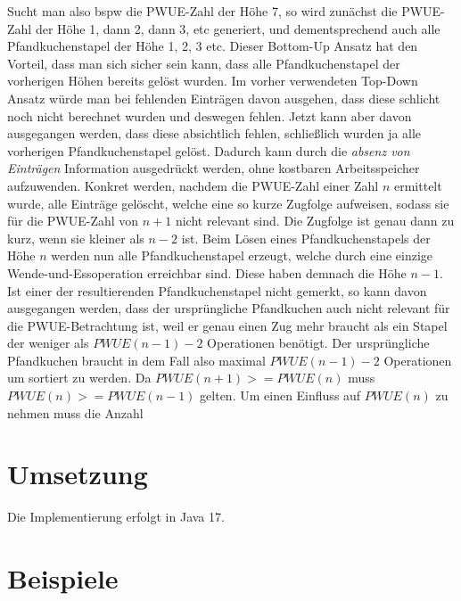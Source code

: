 Sucht man also bspw die PWUE-Zahl der Höhe 7, so wird zunächst die PWUE-Zahl der Höhe 1, dann 2, dann 3, etc generiert,
und dementsprechend auch alle Pfandkuchenstapel der Höhe 1, 2, 3 etc.
Dieser Bottom-Up Ansatz hat den Vorteil, dass man sich sicher sein kann, dass alle Pfandkuchenstapel der vorherigen
Höhen bereits gelöst wurden.
Im vorher verwendeten Top-Down Ansatz würde man bei fehlenden Einträgen davon ausgehen, dass diese schlicht noch nicht
berechnet wurden und deswegen fehlen.
Jetzt kann aber davon ausgegangen werden, dass diese absichtlich fehlen,
schlie{\ss}lich wurden ja alle vorherigen Pfandkuchenstapel gelöst.
Dadurch kann durch die \textit{absenz von Einträgen} Information ausgedrückt werden, ohne kostbaren
Arbeitsspeicher aufzuwenden.
Konkret werden, nachdem die PWUE-Zahl einer Zahl $n$ ermittelt wurde, alle Einträge gelöscht, welche eine so kurze Zugfolge
aufweisen, sodass sie für die PWUE-Zahl von $n + 1$ nicht relevant sind.
Die Zugfolge ist genau dann zu kurz, wenn sie kleiner als $n - 2$ ist.
Beim Lösen eines Pfandkuchenstapels der Höhe $n$ werden nun alle Pfandkuchenstapel erzeugt,
welche durch eine einzige Wende-und-Essoperation erreichbar sind.
Diese haben demnach die Höhe $n - 1$.
Ist einer der resultierenden Pfandkuchenstapel nicht gemerkt, so kann davon ausgegangen werden, dass der ursprüngliche
Pfandkuchen auch nicht relevant für die PWUE-Betrachtung ist, weil er genau einen Zug
mehr braucht als ein Stapel der weniger als $PWUE(n - 1) - 2$ Operationen benötigt.
Der ursprüngliche Pfandkuchen braucht in dem Fall also maximal $PWUE(n - 1) - 2$ Operationen um sortiert zu werden.
Da $PWUE(n + 1) >= PWUE(n)$ muss $PWUE(n) >= PWUE(n - 1)$ gelten.
Um einen Einfluss auf $PWUE(n)$ zu nehmen muss die Anzahl


\section{Umsetzung}\label{sec:umsetzung}
Die Implementierung erfolgt in Java 17.


\section{Beispiele}\label{sec:beispiele}


